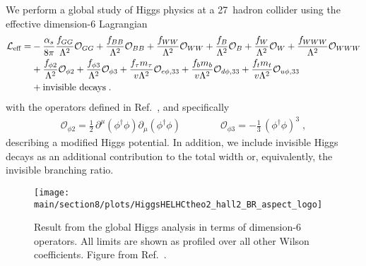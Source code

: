 We perform a global study of Higgs physics at a 27~\UTeV hadron collider
using the effective dimension-6 Lagrangian~\cite{Brivio:2017vri} 
\begin{align}
\mathcal{L}_\text{eff} 
= & - \frac{\alpha_s }{8 \pi} \frac{f_{GG}}{\Lambda^2} \mathcal{O}_{GG}  
    + \frac{f_{BB}}{\Lambda^2} \mathcal{O}_{BB} 
    + \frac{f_{WW}}{\Lambda^2} \mathcal{O}_{WW} 
    + \frac{f_B}{\Lambda^2} \mathcal{O}_B 
    + \frac{f_W}{\Lambda^2} \mathcal{O}_W 
    + \frac{f_{WWW}}{\Lambda^2} \mathcal{O}_{WWW} \notag \\ 
  &  + \frac{f_{\phi 2}}{\Lambda^2} \mathcal{O}_{\phi 2} 
    + \frac{f_{\phi 3}}{\Lambda^2} \mathcal{O}_{\phi 3} 
    + \frac{f_\tau m_\tau}{v \Lambda^2} \mathcal{O}_{e\phi,33} 
    + \frac{f_b m_b}{v \Lambda^2} \mathcal{O}_{d\phi,33} 
    + \frac{f_t m_t}{v \Lambda^2} \mathcal{O}_{u\phi,33} \notag \\
  & + \text{invisible decays} \; .
\label{eq:ourleff}
\end{align}
%
with the operators defined in Ref.~\cite{Butter:2016cvz}, 
and specifically
%
\begin{align}
\mathcal{O}_{\phi 2} = \frac{1}{2} \, \partial^\mu (\phi^\dagger \phi) \partial_\mu (\phi^\dagger \phi)  
\qquad \qquad
\mathcal{O}_{\phi 3} = -\frac{1}{3} \, (\phi^\dagger \phi)^3 \; ,
\label{eq:ope23}
\end{align}
%
describing a modified Higgs potential. In addition, we include invisible 
Higgs decays as an additional contribution to the total width or, equivalently, 
the invisible branching ratio.
\begin{figure}
\centering
\texttt{[image: \\main/section8/plots/HiggsHELHCtheo2\_hall2\_BR\_aspect\_logo]}
\caption{Result from the global Higgs analysis in terms of dimension-6
  operators. All limits are shown as profiled over all other Wilson
  coefficients. Figure from Ref.~\cite{Biekotter:2018jzu}.}
\label{fig:d6}
\end{figure}

